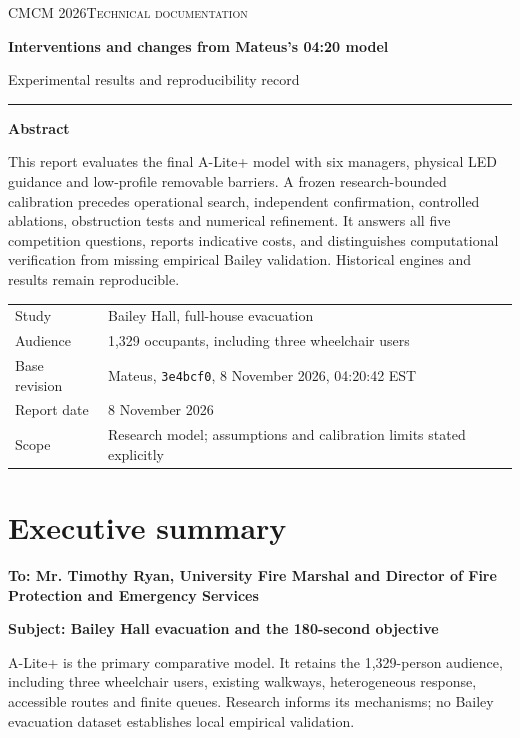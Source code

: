 \documentclass[11pt,a4paper]{article}
\begin{document}
\begin{titlepage}
\thispagestyle{empty}
{\small\scshape CMCM 2026\quad Technical documentation}\par
\vspace{22mm}
{\Huge\bfseries Interventions and changes from Mateus's 04:20 model\par}
\vspace{7mm}
{\Large Experimental results and reproducibility record\par}
\vspace{12mm}
{\color{ink}\rule{\linewidth}{0.7pt}}\par
\vspace{5mm}
\textbf{Abstract}\par
This report evaluates the final A-Lite+ model with six managers, physical LED guidance and low-profile removable barriers. A frozen research-bounded calibration precedes operational search, independent confirmation, controlled ablations, obstruction tests and numerical refinement. It answers all five competition questions, reports indicative costs, and distinguishes computational verification from missing empirical Bailey validation. Historical engines and results remain reproducible.
\vfill
\begin{tabular}{@{}ll@{}}
Study & Bailey Hall, full-house evacuation\\
Audience & 1,329 occupants, including three wheelchair users\\
Base revision & Mateus, \texttt{3e4bcf0}, 8 November 2026, 04:20:42 EST\\
Report date & 8 November 2026\\
Scope & Research model; assumptions and calibration limits stated explicitly
\end{tabular}
\vspace{9mm}
\end{titlepage}
\thispagestyle{empty}\section*{Executive summary}
\textbf{To: Mr. Timothy Ryan, University Fire Marshal and Director of Fire Protection and Emergency Services}


\textbf{Subject: Bailey Hall evacuation and the 180-second objective}


A-Lite+ is the primary comparative model. It retains the 1,329-person audience, including three wheelchair users, existing walkways, heterogeneous response, accessible routes and finite queues. Research informs its mechanisms; no Bailey evacuation dataset establishes local empirical validation.
\end{document}
